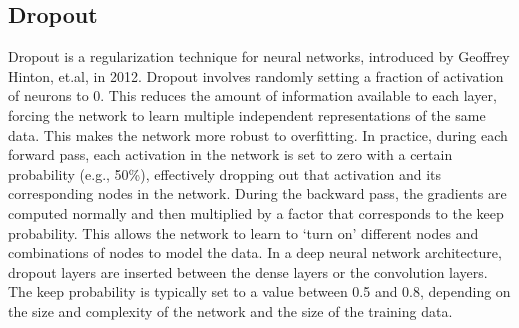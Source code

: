 \subsection{Dropout}
\vspace{-18pt}
Dropout is a regularization technique for neural networks, introduced by Geoffrey Hinton, et.al, in 2012. Dropout involves randomly setting a fraction of activation of neurons to 0. This reduces the amount of information available to each layer, forcing the network to learn multiple independent representations of the same data. This makes the network more robust to overfitting. In practice, during each forward pass, each activation in the network is set to zero with a certain probability (e.g., 50\%), effectively dropping out that activation and its corresponding nodes in the network. During the backward pass, the gradients are computed normally and then multiplied by a factor that corresponds to the keep probability. This allows the network to learn to ‘turn on’ different nodes and combinations of nodes to model the data. In a deep neural network architecture, dropout layers are inserted between the dense layers or the convolution layers. The keep probability is typically set to a value between 0.5 and 0.8, depending on the size and complexity of the network and the size of the training data.

